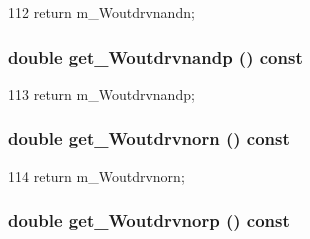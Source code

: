 \begin{DoxyCode}
112 { return m_Woutdrvnandn; }
\end{DoxyCode}
\hypertarget{classTechParameter_a512db72bbf5f101f6f4c85efb9540ca5}{
\subsubsection[{get\_\-Woutdrvnandp}]{\setlength{\rightskip}{0pt plus 5cm}double get\_\-Woutdrvnandp () const}}
\label{classTechParameter_a512db72bbf5f101f6f4c85efb9540ca5}



\begin{DoxyCode}
113 { return m_Woutdrvnandp; }
\end{DoxyCode}
\hypertarget{classTechParameter_ad2649aca227382ec31e1ab27b2336bd1}{
\subsubsection[{get\_\-Woutdrvnorn}]{\setlength{\rightskip}{0pt plus 5cm}double get\_\-Woutdrvnorn () const}}
\label{classTechParameter_ad2649aca227382ec31e1ab27b2336bd1}



\begin{DoxyCode}
114 { return m_Woutdrvnorn; }
\end{DoxyCode}
\hypertarget{classTechParameter_a599b880e77a44bd7972f6f05aaa5f746}{
\subsubsection[{get\_\-Woutdrvnorp}]{\setlength{\rightskip}{0pt plus 5cm}double get\_\-Woutdrvnorp () const}}
\label{classTechParameter_a599b880e77a44bd7972f6f05aaa5f746}



